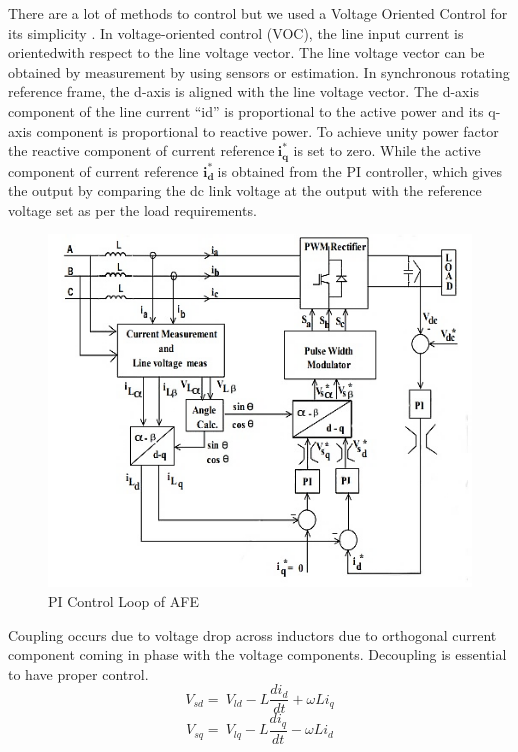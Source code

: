 \documentclass[12pt,a4paper]{book}
\begin{document}
There are a lot of methods to control but we used a Voltage Oriented Control for its simplicity \cite{pid2015}.
In voltage-oriented control (VOC), the line input current is orientedwith respect to the line voltage vector. The line voltage vector can be obtained by measurement by using sensors or estimation. In synchronous rotating reference frame, the d-axis is aligned with the line voltage vector. The d-axis component of the line current ``id'' is proportional to the active power and its q-axis component is proportional to reactive power. To achieve unity power factor the reactive component of current reference\(\ \mathbf{i}_{\mathbf{q}}^{\mathbf{*}}\) is set to zero. While the active component of current reference \(\mathbf{i}_{\mathbf{d}}^{\mathbf{*}}\mathbf{\ }\)is obtained from the PI controller, which gives the output by comparing the dc link voltage at the output with the reference voltage set as per the load requirements.

\begin{figure}[h]
  \centering
  \includegraphics[width=15cm]{image13.png}
  \caption{PI Control Loop of AFE}
  \label{fig:image13}
\end{figure}

Coupling occurs due to voltage drop across inductors due to orthogonal current component coming in phase with the voltage components. Decoupling is essential to have proper control.
\begin{equation}
  V_{sd}=\ V_{ld}-L\frac{{di}_d}{dt}+\omega Li_q
  \label{equation:eq4}
\end{equation}
\begin{equation}
  V_{sq}=\ V_{lq}-L\frac{{di}_q}{dt}-\omega Li_d
  \label{equation:eq5}
\end{equation}
\end{document}
